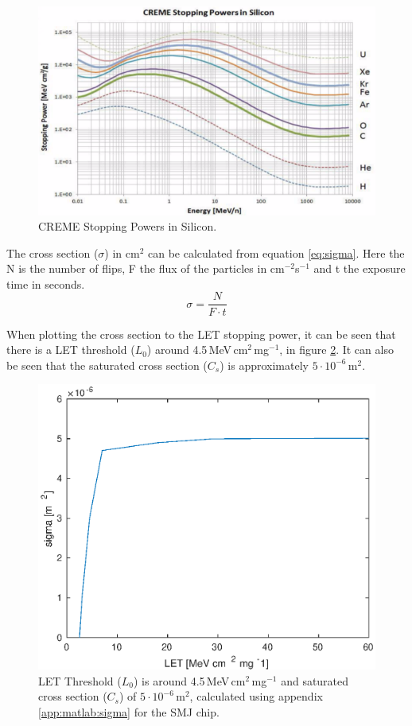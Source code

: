 \begin{figure}[H]
\centering
\includegraphics[width=1\textwidth]{figures/stoppingPower.png}
\caption{CREME Stopping Powers in Silicon.}
\label{fig:LET-stoppingpower}
\end{figure}

The cross section ($\sigma$) in cm$^2$ can be calculated from equation \ref{eq:sigma}. Here the N is the number of flips, F the flux of the particles in cm$^{-2}$s$^{-1}$ and t the exposure time in seconds.
\begin{equation}
\sigma = \frac{N}{F \cdot t} \label{eq:sigma}
\end{equation}

When plotting the cross section to the LET stopping power, it can be seen that there is a LET threshold ($L_0$) around 4.5\,MeV\,cm$^2$\,mg$^{-1}$, in figure \ref{fig:matlab:LET-sigma}. It can also be seen that the saturated cross section ($C_s$) is approximately $5 \cdot 10^{-6}$\,m$^2$.
\begin{figure}[H]
\centering
\includegraphics[width=.7\textwidth]{data/sigma/L0.eps}
\caption{LET Threshold ($L_0$) is around 4.5\,MeV\,cm$^2$\,mg$^{-1}$ and saturated cross section ($C_s$) of $5 \cdot 10^{-6}$\,m$^2$, calculated using appendix \ref{app:matlab:sigma} for the SMJ chip.}
\label{fig:matlab:LET-sigma}
\end{figure}

